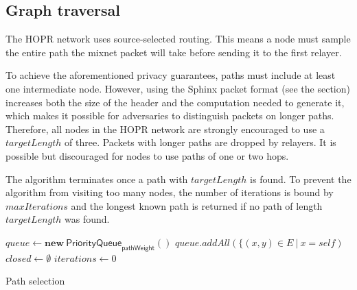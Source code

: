 \subsection{Graph traversal}
\label{sec:path-selection:graph-traversal}

The HOPR network uses source-selected routing. This means a node must sample the entire path the mixnet packet will take before sending it to the first relayer.

To achieve the aforementioned privacy guarantees, paths must include at least one intermediate node. However, using the Sphinx packet format (see the  section) increases both the size of the header and the computation needed to generate it, which makes it possible for adversaries to distinguish packets on longer paths. Therefore, all nodes in the HOPR network are strongly encouraged to use a $targetLength$ of three. Packets with longer paths are dropped by relayers. It is possible but discouraged for nodes to use paths of one or two hops.

The algorithm terminates once a path with $targetLength$ is found. To prevent the algorithm from visiting too many nodes, the number of iterations is bound by $maxIterations$ and the longest known path is returned if no path of length $targetLength$ was found.

\begin{algorithm}[H]
    \SetAlgoNoLine
    \DontPrintSemicolon
    \;
    $queue \leftarrow \mathbf{new} \ \mathsf{PriorityQueue}_{\textsf{pathWeight}}()$\;
    $queue.addAll(\{ (x,y) \in E \ | \ x = self)$\;
    $closed \leftarrow \emptyset$\;
    $iterations \leftarrow 0$\;
    \;
    \caption{Path selection}
\end{algorithm}
